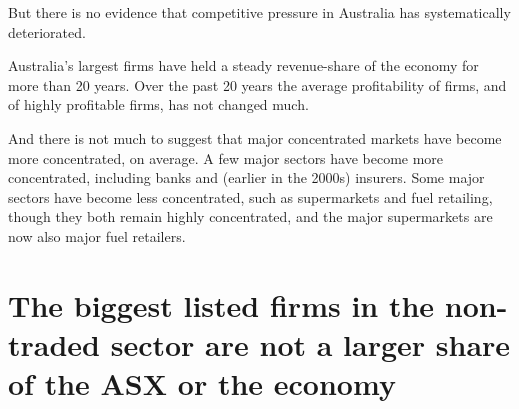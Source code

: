 

But there is no evidence that competitive pressure in Australia has systematically deteriorated. 

Australia's largest firms have held a steady revenue-share of the economy for more than 20 years. Over the past 20 years the average profitability of firms, and of highly profitable firms, has not changed much.

And there is not much to suggest that major concentrated markets have become more concentrated, on average. A few major sectors have become more concentrated, including banks and (earlier in the 2000s) insurers. Some major sectors have become less concentrated, such as supermarkets and fuel retailing, though they both remain highly concentrated, and the major supermarkets are now also major fuel retailers. 
\section{The biggest listed firms in the non-traded sector are not a larger share of the ASX or the economy}

